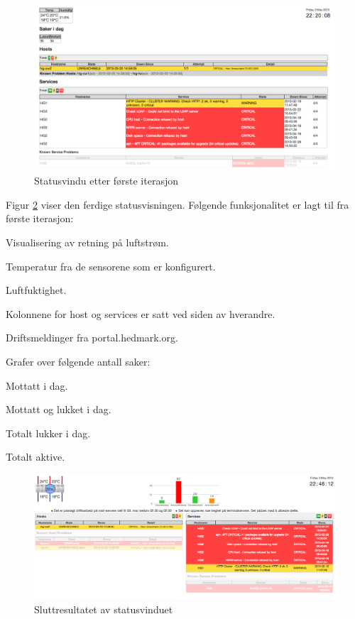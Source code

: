 \begin{figure}[H]
    \centering
    \includegraphics[scale=0.3]{img/statusvindu_first}
    \caption{Statusvindu etter første iterasjon}
    \label{statusvindu_first}
\end{figure}

Figur \ref{statusvindu_final} viser den ferdige statusvisningen. Følgende funksjonalitet er lagt til fra første iterasjon:

\begin{itemize*}
	\item Visualisering av retning på luftstrøm.
	\item Temperatur fra de sensorene som er konfigurert.
	\item Luftfuktighet.
	\item Kolonnene for host og services er satt ved siden av hverandre.
	\item Driftsmeldinger fra portal.hedmark.org.
	\item Grafer over følgende antall saker: 
	\begin{itemize*}
		\item Mottatt i dag.
		\item Mottatt og lukket i dag.
		\item Totalt lukker i dag.
		\item Totalt aktive.
	\end{itemize*}
\end{itemize*}

\begin{figure}[H]
    \centering
    \includegraphics[scale=0.3]{img/statusvindu_final}
    \caption{Sluttresultatet av statusvinduet}
    \label{statusvindu_final}
\end{figure}

